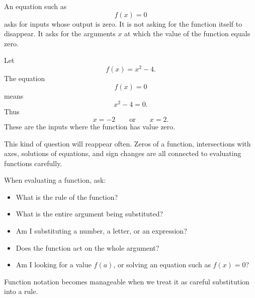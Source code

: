 An equation such as
\[
f(x)=0
\]
asks for inputs whose output is zero. It is not asking for the function itself to disappear. It asks for the arguments \(x\) at which the value of the function equals zero.

\begin{examplebox}
Let
\[
f(x)=x^2-4.
\]
The equation
\[
f(x)=0
\]
means
\[
x^2-4=0.
\]
Thus
\[
x=-2
\qquad\text{or}\qquad
x=2.
\]
These are the inputs where the function has value zero.
\end{examplebox}

This kind of question will reappear often. Zeros of a function, intersections with axes, solutions of equations, and sign changes are all connected to evaluating functions carefully.

\begin{summarybox}
When evaluating a function, ask:
\begin{itemize}
\item What is the rule of the function?
\item What is the entire argument being substituted?
\item Am I substituting a number, a letter, or an expression?
\item Does the function act on the whole argument?
\item Am I looking for a value \(f(a)\), or solving an equation such as \(f(x)=0\)?
\end{itemize}
\end{summarybox}

Function notation becomes manageable when we treat it as careful substitution into a rule.